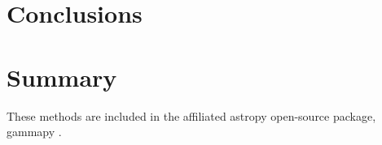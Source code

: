 \documentclass{PoS}
\begin{document}
\section{Conclusions}


\section{Summary}
These methods are included in the affiliated astropy open-source package, gammapy \cite{Deil}.

\begin{thebibliography}{99}





\end{thebibliography}
\end{document}
